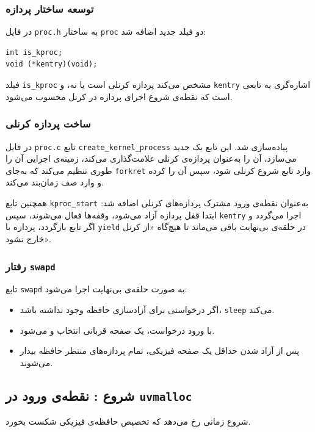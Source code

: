\documentclass[12pt]{article}
\begin{document}
\subsubsection{توسعه ساختار پردازه}
در فایل \texttt{proc.h} به ساختار \texttt{proc} دو فیلد جدید اضافه شد:
\begin{LTR}
\begin{lstlisting}
int is_kproc;
void (*kentry)(void);
\end{lstlisting}
\end{LTR}

فیلد \texttt{is\_kproc} مشخص می‌کند پردازه کرنلی است یا نه، و \texttt{kentry} اشاره‌گری به تابعی است که نقطه‌ی شروع اجرای پردازه در کرنل محسوب می‌شود.

\subsubsection{ساخت پردازه کرنلی}
در فایل \texttt{proc.c} تابع \texttt{create\_kernel\_process} پیاده‌سازی شد. این تابع یک  جدید می‌سازد، آن را به‌عنوان پردازه‌ی کرنلی علامت‌گذاری می‌کند، زمینه‌ی اجرایی آن را طوری تنظیم می‌کند که به‌جای \texttt{forkret} وارد تابع شروع کرنلی شود، سپس آن را  کرده و وارد صف زمان‌بند می‌کند.

همچنین تابع \texttt{kproc\_start} به‌عنوان نقطه‌ی ورود مشترک پردازه‌های کرنلی اضافه شد: ابتدا قفل پردازه آزاد می‌شود، وقفه‌ها فعال می‌شوند، سپس \texttt{kentry} اجرا می‌گردد و اگر تابع بازگردد، پردازه با \texttt{yield} در حلقه‌ی بی‌نهایت باقی می‌ماند تا هیچ‌گاه «از کرنل خارج نشود».

\subsubsection{رفتار \texttt{swapd}}
تابع \texttt{swapd} به صورت حلقه‌ی بی‌نهایت اجرا می‌شود:
\begin{itemize}
  \item اگر درخواستی برای آزادسازی حافظه وجود نداشته باشد، \texttt{sleep} می‌کند.
  \item با ورود درخواست، یک صفحه قربانی انتخاب و  می‌شود.
  \item پس از آزاد شدن حداقل یک صفحه فیزیکی، تمام پردازه‌های منتظر حافظه بیدار می‌شوند.
\end{itemize}

\subsection{شروع : نقطه‌ی ورود در \texttt{uvmalloc}}
شروع  زمانی رخ می‌دهد که تخصیص حافظه‌ی فیزیکی شکست بخورد.
\end{document}
